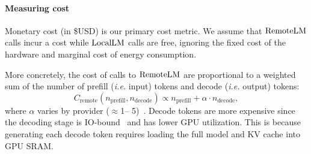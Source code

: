 \vspace{-0.5em}\paragraph{Measuring cost}

Monetary cost (in \$USD) is our primary cost metric. We assume that $\mathrm{RemoteLM}$ calls incur a cost while $\mathrm{LocalLM}$ calls are free, ignoring the fixed cost of the hardware and marginal cost of energy consumption. 

More concretely, the cost of calls to $\mathrm{RemoteLM}$ are proportional to a weighted sum of the number of prefill (\textit{i.e.} input) tokens and decode (\textit{i.e.} output) tokens:
\begin{equation*}
    C_{\text{remote}}(n_{\text{prefill}}, n_{\text{decode}}) \propto n_{\text{prefill}} + \alpha \cdot n_{\text{decode}},
\end{equation*}
where $\alpha$ varies by provider ($\approx$1-- 5)~\citep{dubey2024llama3,anthropic2024claude}.
Decode tokens are more expensive since the decoding stage is IO-bound~\citep{leviathan2023fast} and has lower GPU utilization. This is because generating each decode token requires loading the full model and KV cache into GPU SRAM.
    

